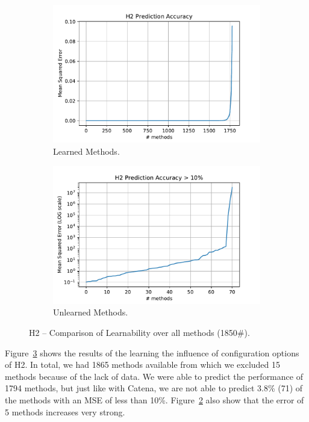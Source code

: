 \begin{figure}[h]
	\centering
	\begin{subfigure}{.5\textwidth}
	  \centering
	  \includegraphics[width=.99\linewidth]{images/H2_plt_learnable_func_all_model_mse}
	  \caption{Learned Methods.}
	  \label{fig:h2_model_mse_lern}
	\end{subfigure}%
	\begin{subfigure}{.5\textwidth}
	  \centering
	  \includegraphics[width=.99\linewidth]{images/H2_plt_unlearnable_func_all_model_mse_log}
	  \caption{Unlearned Methods.}
	  \label{fig:h2_model_mse_unlern}
	\end{subfigure}
	\caption{H2 -- Comparison of Learnability over all methods (1850\#).}
	\label{fig:h_lernability_all_methods}
\end{figure}

Figure~\ref{fig:h_lernability_all_methods} shows the results of the learning the influence of configuration options of H2. In total, we had 1865 methods available from which we excluded 15 methods because of the lack of data. We were able to predict the performance of 1794 methods, but just like with Catena, we are not able to predict 3.8\% (71) of the methods with an \ac{MSE} of less than 10\%. Figure~\ref{fig:h2_model_mse_unlern} also show that the error of 5 methods increases very strong. 

